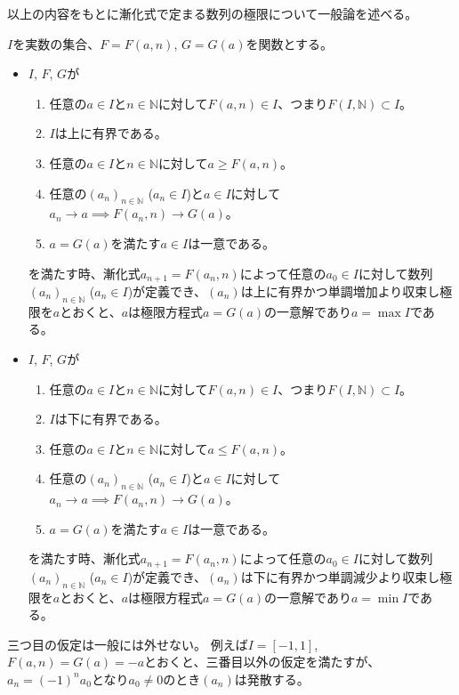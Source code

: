以上の内容をもとに漸化式で定まる数列の極限について一般論を述べる。

\begin{theorem}
$I$を実数の集合、$F = F(a, n)$, $G = G(a)$を関数とする。
\begin{itemize}
\item
$I$, $F$, $G$が
\begin{enumerate}
\item
任意の$a \in I$と$n \in \mathbb{N}$に対して$F(a, n) \in I$、つまり$F(I, \mathbb{N}) \subset I$。
\item
$I$は上に有界である。
\item
任意の$a \in I$と$n \in \mathbb{N}$に対して$a \ge F(a, n)$。
\item
任意の$(a_n)_{n \in \mathbb{N}}$ ($a_n \in I$)と$a \in I$に対して$a_n \to a \implies F(a_n, n) \to G(a)$。
\item
$a = G(a)$を満たす$a \in I$は一意である。
\end{enumerate}
を満たす時、漸化式$a_{n+1} = F(a_n, n)$によって任意の$a_0 \in I$に対して数列$(a_n)_{n \in \mathbb{N}}$ ($a_n \in I$)が定義でき、$(a_n)$は上に有界かつ単調増加より収束し極限を$a$とおくと、$a$は極限方程式$a = G(a)$の一意解であり$a = \max I$である。
\item
$I$, $F$, $G$が
\begin{enumerate}
\item
任意の$a \in I$と$n \in \mathbb{N}$に対して$F(a, n) \in I$、つまり$F(I, \mathbb{N}) \subset I$。
\item
$I$は下に有界である。
\item
任意の$a \in I$と$n \in \mathbb{N}$に対して$a \le F(a, n)$。
\item
任意の$(a_n)_{n \in \mathbb{N}}$ ($a_n \in I$)と$a \in I$に対して$a_n \to a \implies F(a_n, n) \to G(a)$。
\item
$a = G(a)$を満たす$a \in I$は一意である。
\end{enumerate}
を満たす時、漸化式$a_{n+1} = F(a_n, n)$によって任意の$a_0 \in I$に対して数列$(a_n)_{n \in \mathbb{N}}$ ($a_n \in I$)が定義でき、$(a_n)$は下に有界かつ単調減少より収束し極限を$a$とおくと、$a$は極限方程式$a = G(a)$の一意解であり$a = \min I$である。
\end{itemize}
\end{theorem}

\begin{remark}
三つ目の仮定は一般には外せない。
例えば$I = [-1, 1]$, $F(a, n) = G(a) = -a$とおくと、三番目以外の仮定を満たすが、
$a_n = (-1)^n a_0$となり$a_0 \ne 0$のとき$(a_n)$は発散する。
\end{remark}

